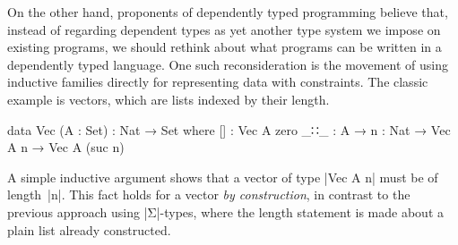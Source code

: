 On the other hand, proponents of dependently typed programming believe that, instead of regarding dependent types as yet another type system we impose on existing programs, we should rethink about what programs can be written in a dependently typed language.
One such reconsideration is the movement of using inductive families directly for representing data with constraints.
The classic example is vectors, which are lists indexed by their length.
\begin{code}
data Vec (A : Set) : Nat → Set where
  []   : Vec A zero
  _∷_  : A → {n : Nat} → Vec A n → Vec A (suc n)
\end{code}
A simple inductive argument shows that a vector of type |Vec A n| must be of length~|n|.
This fact holds for a vector \emph{by construction}, in contrast to the previous approach using |Σ|-types, where the length statement is made about a plain list already constructed.

